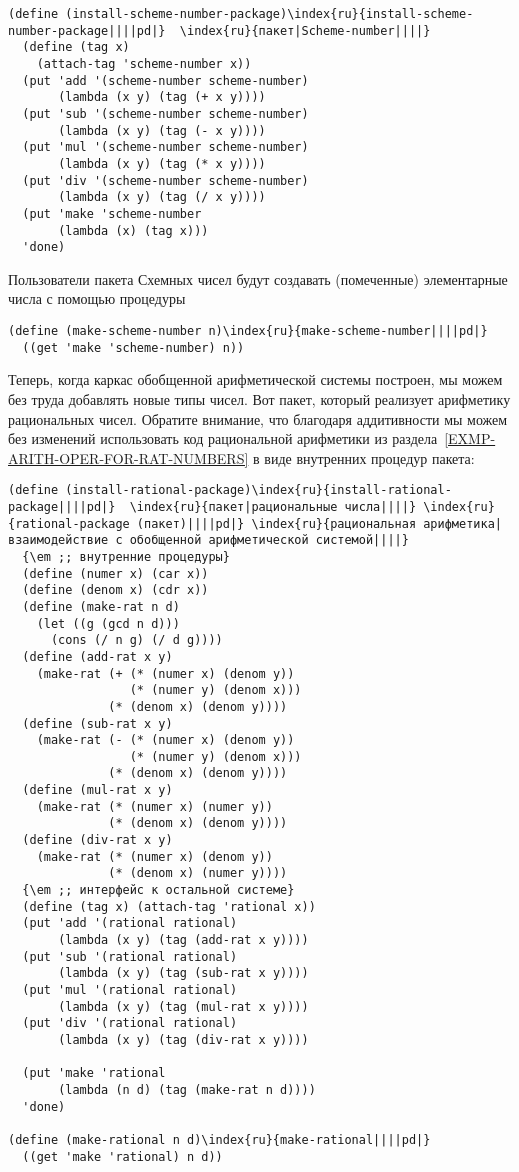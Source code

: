 \begin{Verbatim}[fontsize=\small]
(define (install-scheme-number-package)\index{ru}{install-scheme-number-package||||pd|}  \index{ru}{пакет|Scheme-number||||}
  (define (tag x)
    (attach-tag 'scheme-number x))
  (put 'add '(scheme-number scheme-number)
       (lambda (x y) (tag (+ x y))))
  (put 'sub '(scheme-number scheme-number)
       (lambda (x y) (tag (- x y))))
  (put 'mul '(scheme-number scheme-number)
       (lambda (x y) (tag (* x y))))
  (put 'div '(scheme-number scheme-number)
       (lambda (x y) (tag (/ x y))))
  (put 'make 'scheme-number
       (lambda (x) (tag x)))
  'done)
\end{Verbatim}

Пользователи пакета Схемных чисел будут создавать
(помеченные) элементарные числа с помощью процедуры

\begin{Verbatim}[fontsize=\small]
(define (make-scheme-number n)\index{ru}{make-scheme-number||||pd|}
  ((get 'make 'scheme-number) n))
\end{Verbatim}

Теперь, когда каркас обобщенной арифметической системы
построен, мы можем без труда добавлять новые типы чисел.  Вот пакет,
который реализует арифметику рациональных чисел.  Обратите
внимание, что благодаря аддитивности мы можем без изменений использовать код
рациональной арифметики из 
раздела~\ref{EXMP-ARITH-OPER-FOR-RAT-NUMBERS} в виде внутренних
процедур пакета:

\begin{Verbatim}[fontsize=\small]
(define (install-rational-package)\index{ru}{install-rational-package||||pd|}  \index{ru}{пакет|рациональные числа||||} \index{ru}{rational-package (пакет)||||pd|} \index{ru}{рациональная арифметика|взаимодействие с обобщенной арифметической системой||||}
  {\em ;; внутренние процедуры}
  (define (numer x) (car x))
  (define (denom x) (cdr x))
  (define (make-rat n d)
    (let ((g (gcd n d)))
      (cons (/ n g) (/ d g))))
  (define (add-rat x y)
    (make-rat (+ (* (numer x) (denom y))
                 (* (numer y) (denom x)))
              (* (denom x) (denom y))))
  (define (sub-rat x y)
    (make-rat (- (* (numer x) (denom y))
                 (* (numer y) (denom x)))
              (* (denom x) (denom y))))
  (define (mul-rat x y)
    (make-rat (* (numer x) (numer y))
              (* (denom x) (denom y))))
  (define (div-rat x y)
    (make-rat (* (numer x) (denom y))
              (* (denom x) (numer y))))
  {\em ;; интерфейс к остальной системе}
  (define (tag x) (attach-tag 'rational x))
  (put 'add '(rational rational)
       (lambda (x y) (tag (add-rat x y))))
  (put 'sub '(rational rational)
       (lambda (x y) (tag (sub-rat x y))))
  (put 'mul '(rational rational)
       (lambda (x y) (tag (mul-rat x y))))
  (put 'div '(rational rational)
       (lambda (x y) (tag (div-rat x y))))

  (put 'make 'rational
       (lambda (n d) (tag (make-rat n d))))
  'done)

(define (make-rational n d)\index{ru}{make-rational||||pd|}
  ((get 'make 'rational) n d))
\end{Verbatim}

